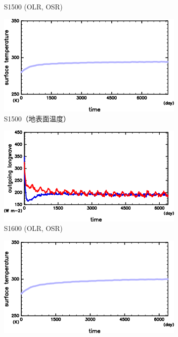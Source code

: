 \documentclass[body]{subfiles}
\begin{document}
\begin{figure}[t]
\begin{subfigure}{.4\textwidth}
		\caption{S1500 (OLR, OSR)}\label{S1500_OLRA}
	\end{subfigure}
	\begin{subfigure}{.4\textwidth}
		\centering
		\includegraphics[width=\textwidth]{S1500/S1500_SurfTemp_horimean_time0.0-7300.0-crop.png}
		\caption{S1500（地表面温度）}\label{S1500_SurfTemp}
	\end{subfigure}
	\begin{subfigure}{.4\textwidth}
		\centering
		\includegraphics[width=\textwidth]{S1600/S1600_OLRA-OSRA_horimean_time0.0-7300.0-crop.png}
		\caption{S1600 (OLR, OSR)}\label{S1600_OLRA}
	\end{subfigure}
	\begin{subfigure}{.4\textwidth}
		\centering
		\includegraphics[width=\textwidth]{S1600/S1600_SurfTemp_horimean_time0.0-7300.0-crop.png}

\end{subfigure}
\end{figure}
\end{document}

